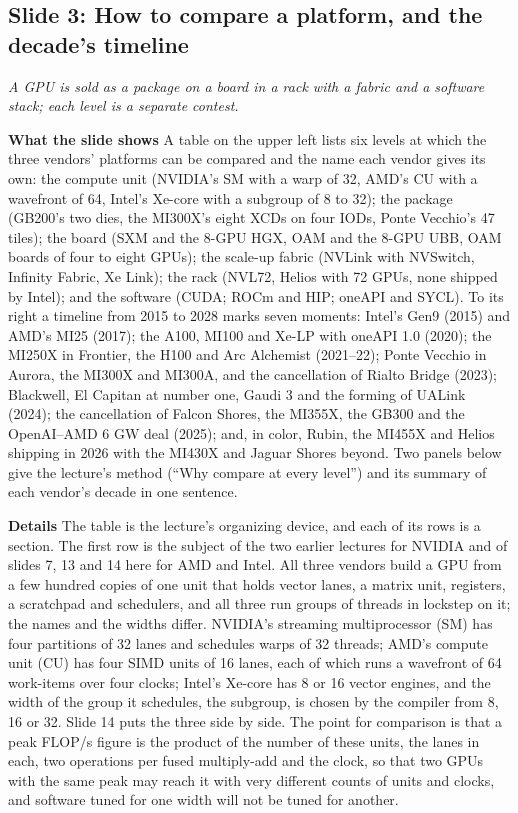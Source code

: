 \documentclass[11pt,letterpaper]{article}
\newcommand{\slide}[3]{%
  \subsection[Slide #1: #2]{Slide #1: #2}%
  {\color{muted}\itshape #3\par}\medskip}
\newcommand{\para}[1]{\medskip\noindent\textbf{#1}\quad}
\begin{document}
\slide{3}{How to compare a platform, and the decade's timeline}{A GPU is sold as a package on a board in a rack with a fabric and a software stack; each level is a separate contest.}

\para{What the slide shows} A table on the upper left lists six levels at which the three vendors' platforms can be compared and the name each vendor gives its own: the compute unit (NVIDIA's SM with a warp of 32, AMD's CU with a wavefront of 64, Intel's Xe-core with a subgroup of 8 to 32); the package (GB200's two dies, the MI300X's eight XCDs on four IODs, Ponte Vecchio's 47 tiles); the board (SXM and the 8-GPU HGX, OAM and the 8-GPU UBB, OAM boards of four to eight GPUs); the scale-up fabric (NVLink with NVSwitch, Infinity Fabric, Xe Link); the rack (NVL72, Helios with 72 GPUs, none shipped by Intel); and the software (CUDA; ROCm and HIP; oneAPI and SYCL). To its right a timeline from 2015 to 2028 marks seven moments: Intel's Gen9 (2015) and AMD's MI25 (2017); the A100, MI100 and Xe-LP with oneAPI 1.0 (2020); the MI250X in Frontier, the H100 and Arc Alchemist (2021--22); Ponte Vecchio in Aurora, the MI300X and MI300A, and the cancellation of Rialto Bridge (2023); Blackwell, El Capitan at number one, Gaudi 3 and the forming of UALink (2024); the cancellation of Falcon Shores, the MI355X, the GB300 and the OpenAI--AMD 6 GW deal (2025); and, in color, Rubin, the MI455X and Helios shipping in 2026 with the MI430X and Jaguar Shores beyond. Two panels below give the lecture's method (``Why compare at every level'') and its summary of each vendor's decade in one sentence.

\para{Details} The table is the lecture's organizing device, and each of its rows is a section. The first row is the subject of the two earlier lectures for NVIDIA and of slides 7, 13 and 14 here for AMD and Intel. All three vendors build a GPU from a few hundred copies of one unit that holds vector lanes, a matrix unit, registers, a scratchpad and schedulers, and all three run groups of threads in lockstep on it; the names and the widths differ. NVIDIA's streaming multiprocessor (SM) has four partitions of 32 lanes and schedules warps of 32 threads; AMD's compute unit (CU) has four SIMD units of 16 lanes, each of which runs a wavefront of 64 work-items over four clocks; Intel's Xe-core has 8 or 16 vector engines, and the width of the group it schedules, the subgroup, is chosen by the compiler from 8, 16 or 32. Slide 14 puts the three side by side. The point for comparison is that a peak FLOP/s figure is the product of the number of these units, the lanes in each, two operations per fused multiply-add and the clock, so that two GPUs with the same peak may reach it with very different counts of units and clocks, and software tuned for one width will not be tuned for another.
\end{document}
